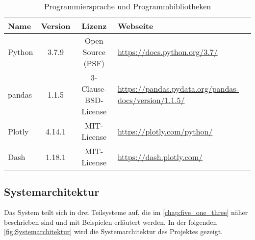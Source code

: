     \begingroup
        \setlength{\tabcolsep}{4pt} %
        \renewcommand{\arraystretch}{1.5}
        \begin{table}[H]
            \centering
            \begin{adjustbox}{max width=\textwidth}
            \Huge
            \begin{tabular}{lccl}
               \toprule
               \textbf{Name}             &{Version}    &\textbf{Lizenz}                        & \textbf{Webseite}\\
               \midrule     
                    Python               &3.7.9         &Open Source (PSF)                     & \url{https://docs.python.org/3.7/}\\
                    pandas               &1.1.5         &3-Clause-BSD-License                  & \url{https://pandas.pydata.org/pandas-docs/version/1.1.5/}\\
                    Plotly               &4.14.1       &MIT-License                           & \url{https://plotly.com/python/}\\
                    Dash                 &1.18.1        &MIT-License                           & \url{https://dash.plotly.com/}\\


                \bottomrule
            \end{tabular}
            \end{adjustbox}
            \caption{%
                Programmiersprache und Programmbibliotheken
            \label{tab:Software-Requirements}
            }
             \end{table}
        \endgroup
    
    \clearpage
    \subsection{Systemarchitektur}
    
    Das System teilt sich in drei Teilsysteme auf, die im \autoref{chap:five_one_three} näher beschrieben sind und mit Beispielen erläutert werden. 
    In der folgenden \autoref{fig:Systemarchitektur} wird die Systemarchitektur des Projektes gezeigt.

